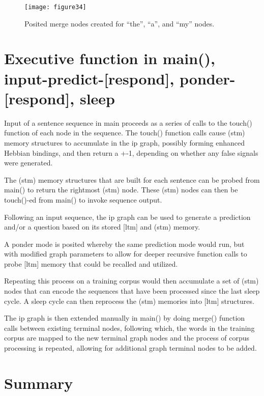 \documentclass{clv3}
\begin{document}
\begin{figure}
\texttt{[image: figure34]}
\caption{Posited merge nodes created for ``the'', ``a'', and ``my'' nodes. }
\end{figure}




\section{Executive function in main(),  input-predict-[respond], ponder-[respond], sleep}


Input of a sentence sequence in main proceeds as a series of calls to the touch() function of each node in the sequence.  The touch() function calls cause (stm) memory structures to accumulate in the ip graph, possibly forming enhanced Hebbian bindings, and then return a +-1, depending on whether any false signals were generated.

The (stm) memory structures that are built for each sentence can be probed from main() to return the rightmost (stm) node.  These (stm) nodes can then be touch()-ed from main() to invoke sequence output.

Following an input sequence, the ip graph can be used to generate a prediction and/or a question based on its stored [ltm] and (stm) memory.

A ponder mode is posited whereby the same prediction mode would run, but with modified graph parameters to allow for deeper recursive function calls to probe [ltm] memory that could be recalled and utilized.



Repeating this process on a training corpus  would then accumulate a set of (stm) nodes that can encode the sequences that have been processed since the last sleep cycle.  A sleep cycle can then reprocess the (stm) memories into [ltm] structures.

The ip graph is then extended manually in main() by doing merge() function calls between existing terminal nodes, following which, the words in the training corpus are mapped to the new terminal graph nodes and the process of corpus processing is repeated, allowing for additional graph terminal nodes to be added.








\section{Summary}
\end{document}
